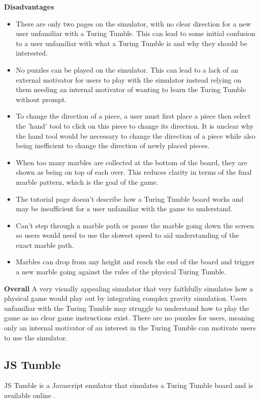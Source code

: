 \documentclass{l4proj}
\begin{document}
\textbf{Disadvantages}
\begin{itemize}
    \item There are only two pages on the simulator, with no clear direction for a new user unfamiliar with a Turing Tumble. This can lead to some initial confusion to a user unfamiliar with what a Turing Tumble is and why they should be interested.
    \item No puzzles can be played on the simulator. This can lead to a lack of an external motivator for users to play with the simulator instead relying on them needing an internal motivator of wanting to learn the Turing Tumble without prompt.
    \item To change the direction of a piece, a user must first place a piece then select the 'hand' tool to click on this piece to change its direction. It is unclear why the hand tool would be necessary to change the direction of a piece while also being inefficient to change the direction of newly placed pieces.
    \item When too many marbles are collected at the bottom of the board, they are shown as being on top of each over. This reduces clarity in terms of the final marble pattern, which is the goal of the game.
    \item The tutorial page doesn't describe how a Turing Tumble board works and may be insufficient for a user unfamiliar with the game to understand.
    \item Can't step through a marble path or pause the marble going down the screen so users would need to use the slowest speed to aid understanding of the exact marble path.
    \item Marbles can drop from any height and reach the end of the board and trigger a new marble going against the rules of the physical Turing Tumble.
\end{itemize}

\textbf{Overall}
A very visually appealing simulator that very faithfully simulates how a physical game would play out by integrating complex gravity simulation. Users unfamiliar with the Turing Tumble may struggle to understand how to play the game as no clear game instructions exist. There are no puzzles for users, meaning only an internal motivator of an interest in the Turing Tumble can motivate users to use the simulator.

\subsection{JS Tumble}
JS Tumble is a Javascript emulator that simulates a Turing Tumble board and is available online \cite{jstumble}.
\end{document}
